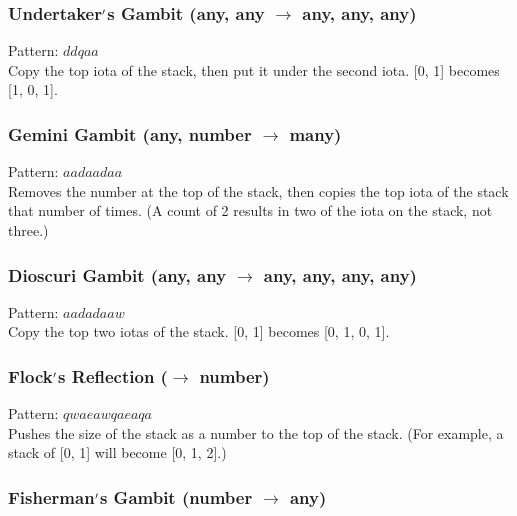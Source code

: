 \documentclass[12pt]{article}
\begin{document}
  \label{sec: patterns/stackmanip@hexcasting:tuck}
\subsubsection*{Undertaker$\rq$s Gambit (any, any $\rightarrow$ any, any, any)}

    Pattern: $ddqaa$\\
      Copy the top iota of the stack, then put it under the second iota. [0, 1] becomes [1, 0, 1].\\


  \label{sec: patterns/stackmanip@hexcasting:duplicate_n}
\subsubsection*{Gemini Gambit (any, number $\rightarrow$ many)}

    Pattern: $aadaadaa$\\
      Removes the number at the top of the stack, then copies the top iota of the stack that number of times. (A count of 2 results in two of the iota on the stack, not three.)\\


  \label{sec: patterns/stackmanip@hexcasting:2dup}
\subsubsection*{Dioscuri Gambit (any, any $\rightarrow$ any, any, any, any)}

    Pattern: $aadadaaw$\\
      Copy the top two iotas of the stack. [0, 1] becomes [0, 1, 0, 1].\\


  \label{sec: patterns/stackmanip@hexcasting:stack_len}
\subsubsection*{Flock$\rq$s Reflection ($\rightarrow$ number)}

    Pattern: $qwaeawqaeaqa$\\
      Pushes the size of the stack as a number to the top of the stack. (For example, a stack of [0, 1] will become [0, 1, 2].)\\


  \label{sec: patterns/stackmanip@hexcasting:fisherman}
\subsubsection*{Fisherman$\rq$s Gambit (number $\rightarrow$ any)}
\end{document}

